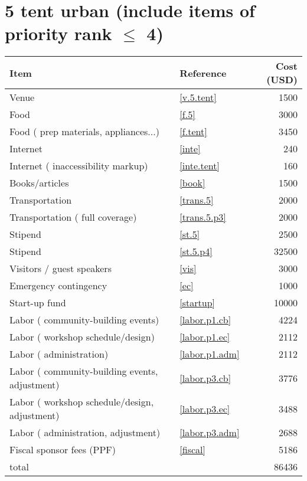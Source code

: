 \section*{5 tent urban (include items of priority rank $\leq$ 4)}
\begin{center}
\begin{tabular}{llr}
Item & Reference & Cost (USD) \\ \hline
Venue & \ref{v.5.tent} & 1500 \\
Food & \ref{f.5} & 3000 \\
Food ( prep materials, appliances...) & \ref{f.tent} & 3450 \\
Internet & \ref{inte} & 240 \\
Internet ( inaccessibility markup) & \ref{inte.tent} & 160 \\
Books/articles & \ref{book} & 1500 \\
Transportation & \ref{trans.5} & 2000 \\
Transportation ( full coverage) & \ref{trans.5.p3} & 2000 \\
Stipend & \ref{st.5} & 2500 \\
Stipend & \ref{st.5.p4} & 32500 \\
Visitors / guest speakers & \ref{vis} & 3000 \\
Emergency contingency & \ref{ec} & 1000 \\
Start-up fund & \ref{startup} & 10000 \\
Labor ( community-building events) & \ref{labor.p1.cb} & 4224 \\
Labor ( workshop schedule/design) & \ref{labor.p1.ec} & 2112 \\
Labor ( administration) & \ref{labor.p1.adm} & 2112 \\
Labor ( community-building events, adjustment) & \ref{labor.p3.cb} & 3776 \\
Labor ( workshop schedule/design, adjustment) & \ref{labor.p3.ec} & 3488 \\
Labor ( administration, adjustment) & \ref{labor.p3.adm} & 2688 \\
Fiscal sponsor fees (PPF) & \ref{fiscal} & 5186 \\ \hline
total &  & 86436
\end{tabular}
\end{center}
\newpage
